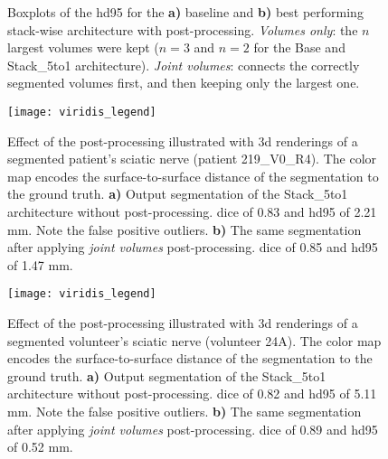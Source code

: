 \begin{figure}[htbp]
	\centering
	\hfill
	\caption[Boxplots of the \glsdesc{hd95} for the Post-processing]{Boxplots of the \acrlong{hd95} for the \textbf{a)} baseline and \textbf{b)} best performing stack-wise architecture with post-processing.  \textit{Volumes only}: the $n$ largest volumes were kept ($n = 3$ and $n = 2$ for the Base and Stack\_5to1 architecture). \textit{Joint volumes}: connects the correctly segmented volumes first, and then keeping only the largest one.}
	\label{fig:pp_boxplots_hd95}  
\end{figure}

\begin{figure}[htbp]
	\centering
	\subfloat[]
	{
		\label{fig:subfig:219_V0_R4_np}            \texttt{[image: 219\_V0\_R4\_np]}
	}
	\hfill
	\subfloat[]
	{
		\label{fig:subfig:219_V0_R4_pp}            \texttt{[image: 219\_V0\_R4\_pp]}
	}
	\hfill
	\texttt{[image: viridis\_legend]}
	
	\caption[3-D Renderings of a Patient Nerve]{Effect of the post-processing illustrated with \gls{3d} renderings of a segmented patient's sciatic nerve (patient 219\_V0\_R4). The color map encodes the surface-to-surface distance of the segmentation to the ground truth. \textbf{a)} Output segmentation of the Stack\_5to1 architecture without post-processing. \acrlong{dice} of 0.83 and \acrlong{hd95} of 2.21 mm. Note the false positive outliers. \textbf{b)} The same segmentation after applying \textit{joint volumes} post-processing.  \acrlong{dice} of 0.85 and \acrlong{hd95} of 1.47 mm.}
	\label{fig:pp_render_219_V0_R4}   
\end{figure}

\begin{figure}[htbp]
	\centering
	\subfloat[]
	{
		\label{fig:subfig:24A_np}            \texttt{[image: 24A\_np]}
	}
	\hfill
	\subfloat[]
	{
		\label{fig:subfig:24A_pp}            \texttt{[image: 24A\_pp]}
	}
	\hfill
	\texttt{[image: viridis\_legend]}
	
	\caption[3-D Renderings of a Volunteer Nerve]{Effect of the post-processing illustrated with \gls{3d} renderings of a segmented volunteer's sciatic nerve (volunteer 24A). The color map encodes the surface-to-surface distance of the segmentation to the ground truth. \textbf{a)} Output segmentation of the Stack\_5to1 architecture without post-processing. \acrlong{dice} of 0.82 and \acrlong{hd95} of 5.11 mm. Note the false positive outliers. \textbf{b)} The same segmentation after applying \textit{joint volumes} post-processing.  \acrlong{dice} of 0.89 and \acrlong{hd95} of 0.52 mm.}
	\label{fig:pp_render_24A}   
\end{figure}

